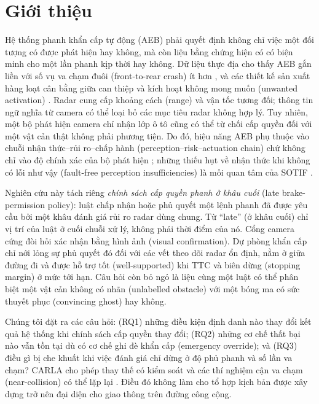 \documentclass[11pt,a4paper]{article}
\begin{document}
\section{Giới thiệu}
Hệ thống phanh khẩn cấp tự động (AEB) phải quyết định không chỉ việc một đối
tượng có được phát hiện hay không, mà còn liệu bằng chứng hiện có có biện minh
cho một lần phanh kịp thời hay không. Dữ liệu thực địa cho thấy AEB gắn liền
với số vụ va chạm đuôi (front-to-rear crash) ít hơn
\cite{cicchino2017effectiveness}, và các thiết kế sản xuất hàng loạt cân bằng
giữa can thiệp và kích hoạt không mong muốn (unwanted activation)
\cite{coelingh2010collision}. Radar cung cấp khoảng cách (range) và vận tốc
tương đối; thông tin ngữ nghĩa từ camera có thể loại bỏ các mục tiêu radar
không hợp lý. Tuy nhiên, một bộ phát hiện camera chỉ nhận lớp ô tô cũng có thể
từ chối cấp quyền đối với một vật cản thật không phải phương tiện. Do đó, hiệu
năng AEB phụ thuộc vào chuỗi nhận thức--rủi ro--chấp hành
(perception--risk--actuation chain) chứ không chỉ vào độ chính xác của bộ phát
hiện \cite{yang2022aebreview}; những thiếu hụt về nhận thức khi không có lỗi
như vậy (fault-free perception insufficiencies) là mối quan tâm của SOTIF
\cite{iso21448}.

Nghiên cứu này tách riêng \emph{chính sách cấp quyền phanh ở khâu cuối} (late
brake-permission policy): luật chấp nhận hoặc phủ quyết một lệnh phanh đã được
yêu cầu bởi một khâu đánh giá rủi ro radar dùng chung. Từ ``late'' (ở khâu
cuối) chỉ vị trí của luật ở cuối chuỗi xử lý, không phải thời điểm của nó. Cổng camera cứng đòi hỏi xác
nhận bằng hình ảnh (visual confirmation). Dự phòng khẩn cấp chỉ nới lỏng sự
phủ quyết đó đối với các vết theo dõi radar ổn định, nằm ở giữa đường đi và
được hỗ trợ tốt (well-supported) khi TTC và biên dừng (stopping margin) ở mức
tới hạn. Câu hỏi còn bỏ ngỏ là liệu cùng một luật
có thể phân biệt một vật cản không có nhãn (unlabelled obstacle) với một bóng
ma có sức thuyết phục (convincing ghost) hay không.

Chúng tôi đặt ra các câu hỏi: (RQ1) những điều kiện định danh nào thay đổi kết
quả hệ thống khi chính sách cấp quyền thay đổi; (RQ2) những cơ chế thất bại
nào vẫn tồn tại dù có cơ chế ghi đè khẩn cấp (emergency override); và (RQ3)
điều gì bị che khuất khi việc đánh giá chỉ dừng ở độ phủ phanh và số lần va
chạm? CARLA cho phép thay thế có kiểm soát và các thí nghiệm cận va chạm
(near-collision) có thể lặp lại \cite{dosovitskiy2017carla,kang2019testing}.
Điều đó không làm cho tổ hợp kịch bản được xây dựng trở nên đại diện cho giao
thông trên đường công cộng.
\end{document}
